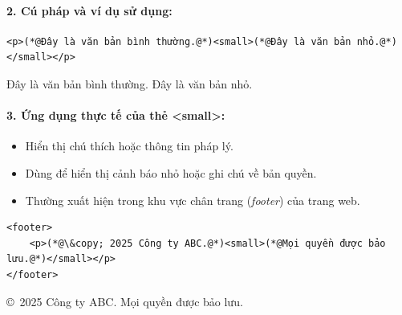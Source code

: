 \paragraph{2. Cú pháp và ví dụ sử dụng:}
\begin{codeWindow}
\begin{lstlisting}[language=HTML5]
<p>(*@Đây là văn bản bình thường.@*)<small>(*@Đây là văn bản nhỏ.@*)</small></p>
\end{lstlisting}
\end{codeWindow}

\begin{tcolorbox}[
    enhanced,
    colback=white,
    colframe=primaryBlue!20,
    arc=6pt,
    boxrule=0.8pt,
    drop shadow=black!3!white,
    top=8pt, bottom=8pt, left=12pt, right=12pt,
    title={\sffamily\bfseries\scriptsize\color{codeComment} KẾT QUẢ HIỂN THỊ TRÊN TRÌNH DUYỆT (BROWSER PREVIEW)},
    coltitle=codeComment,
    colbacktitle=codeBg!80!white
]
Đây là văn bản bình thường. {\small Đây là văn bản nhỏ.}
\end{tcolorbox}


\paragraph{3. Ứng dụng thực tế của thẻ <small>:}
\begin{itemize}[leftmargin=1.5em, itemsep=2pt, parsep=0pt]
    \item Hiển thị chú thích hoặc thông tin pháp lý.
    \item Dùng để hiển thị cảnh báo nhỏ hoặc ghi chú về bản quyền.
    \item Thường xuất hiện trong khu vực chân trang (\textit{footer}) của trang web.
\end{itemize}

\begin{codeWindow}
\begin{lstlisting}[language=HTML5]
<footer>
    <p>(*@\&copy; 2025 Công ty ABC.@*)<small>(*@Mọi quyền được bảo lưu.@*)</small></p>
</footer>
\end{lstlisting}
\end{codeWindow}

\begin{tcolorbox}[
    enhanced,
    colback=white,
    colframe=primaryBlue!20,
    arc=6pt,
    boxrule=0.8pt,
    drop shadow=black!3!white,
    top=8pt, bottom=8pt, left=12pt, right=12pt,
    title={\sffamily\bfseries\scriptsize\color{codeComment} KẾT QUẢ HIỂN THỊ TRÊN TRÌNH DUYỆT (BROWSER PREVIEW)},
    coltitle=codeComment,
    colbacktitle=codeBg!80!white
]
\copyright\ 2025 Công ty ABC. {\small Mọi quyền được bảo lưu.}
\end{tcolorbox}


